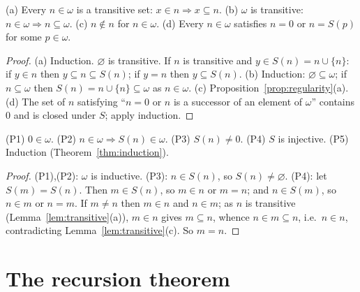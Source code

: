 \begin{lemma}\label{lem:transitive}
	(a) Every $n\in\omega$ is a transitive set: $x\in n\Rightarrow x\subseteq n$. (b) $\omega$ is transitive: $n\in\omega\Rightarrow n\subseteq\omega$. (c) $n\notin n$ for $n\in\omega$. (d) Every $n\in\omega$ satisfies $n=0$ or $n=S(p)$ for some $p\in\omega$.
\end{lemma}
\begin{proof}
	(a) Induction. $\varnothing$ is transitive. If $n$ is transitive and $y\in S(n)=n\cup\{n\}$: if $y\in n$ then $y\subseteq n\subseteq S(n)$; if $y=n$ then $y\subseteq S(n)$. (b) Induction: $\varnothing\subseteq\omega$; if $n\subseteq\omega$ then $S(n)=n\cup\{n\}\subseteq\omega$ as $n\in\omega$. (c) Proposition~\ref{prop:regularity}(a). (d) The set of $n$ satisfying ``$n=0$ or $n$ is a successor of an element of $\omega$'' contains $0$ and is closed under $S$; apply induction.
\end{proof}

\begin{theorem}\label{thm:peano}
	(P1) $0\in\omega$. (P2) $n\in\omega\Rightarrow S(n)\in\omega$. (P3) $S(n)\ne0$. (P4) $S$ is injective. (P5) Induction (Theorem~\ref{thm:induction}).
\end{theorem}
\begin{proof}
	(P1),(P2): $\omega$ is inductive. (P3): $n\in S(n)$, so $S(n)\ne\varnothing$. (P4): let $S(m)=S(n)$. Then $m\in S(n)$, so $m\in n$ or $m=n$; and $n\in S(m)$, so $n\in m$ or $n=m$. If $m\ne n$ then $m\in n$ and $n\in m$; as $n$ is transitive (Lemma~\ref{lem:transitive}(a)), $m\in n$ gives $m\subseteq n$, whence $n\in m\subseteq n$, i.e.\ $n\in n$, contradicting Lemma~\ref{lem:transitive}(c). So $m=n$.
\end{proof}

\section{The recursion theorem}


